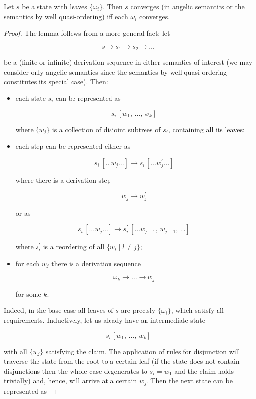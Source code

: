 \begin{lemma}
  \label{lem:convergence-of-leaves}
  Let $s$ be a state with leaves $\{\omega_i\}$. Then $s$ converges (in angelic semantics or the semantics by
  well quasi-ordering) iff each $\omega_i$ converges.
\end{lemma}
\begin{proof}
  The lemma follows from a more general fact: let

  \[
  s\to s_1\to s_2 \to \dots
  \]

  be a (finite or infinite) derivation sequence in either semantics of interest (we may consider
  only angelic semantics since the semantics by well quasi-ordering constitutes its special case).
  Then:

  \begin{itemize}
    \item each state $s_i$ can be represented as
      
      \[
      s_i\,[w_1,\,\dots,\,w_k]
      \]
      
      where $\{w_j\}$ is a collection of disjoint subtrees of $s_i$, containing all its leaves;
      
    \item each step can be represented either as
      
      \[
      s_i\,[\dots w_j\dots]\to s_i\,[\dots w^\prime_j\dots]
      \]

      where there is a derivation step

      \[
      w_j\to w^\prime_j
      \]

      or as

      \[
      s_i\,[\dots w_j\dots]\to s^\prime_i\,[\dots w_{j-1},\,w_{j+1},\,\dots]
      \]

      where $s^\prime_i$ is a reordering of all $\{w_l\mid l\ne j\}$;
     
    \item for each $w_j$ there is a derivation sequence

      \[
      \omega_k\to\dots\to w_j
      \]

      for some $k$.
  \end{itemize}

  Indeed, in the base case all leaves of $s$ are precisly $\{\omega_i\}$, which satisfy all requirements. Inductively, let
  us aleady have an intermediate state

  \[
  s_i\,[w_1,\,\dots,\,w_k]
  \]

  with all $\{w_j\}$ satisfying the claim. The application of rules for disjunction will traverse the state from the root to
  a certain leaf (if the state does not contain disjunctions then the whole case degenerates to $s_i=w_1$ and the claim
  holds trivially) and, hence, will arrive at a certain $w_j$. Then the next state can be represented as


\end{proof}
